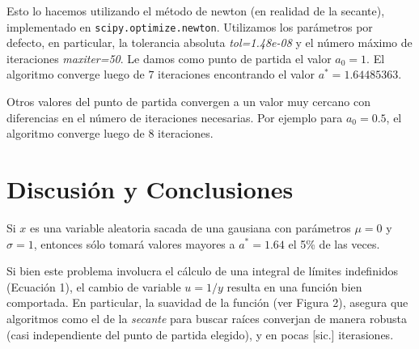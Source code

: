 \documentclass[letter, 11pt]{article}
\begin{document}
Esto lo hacemos utilizando el método de newton (en realidad de la secante),
implementado en \texttt{scipy.optimize.newton}. Utilizamos los parámetros por
defecto, en particular, la tolerancia absoluta {\it tol=1.48e-08} y el número
máximo de iteraciones {\it maxiter=50}. Le damos como punto de partida el valor
$a_0=1$. El algoritmo converge luego de $7$ iteraciones encontrando el valor
$a^*= 1.64485363$.

Otros valores del punto de partida convergen a un valor muy cercano con
diferencias en el número de iteraciones necesarias. Por ejemplo para $a_0=0.5$,
el algoritmo converge luego de 8 iteraciones.

\section{Discusión y Conclusiones}

Si $x$ es una variable aleatoria sacada de una gausiana con parámetros $\mu=0$
y $\sigma=1$, entonces sólo tomará valores mayores a $a^*=1.64$ el 5\% de las
veces.

Si bien este problema involucra el cálculo de una integral de límites
indefinidos (Ecuación 1), el cambio de variable $u = 1/y$ resulta en una
función bien comportada. En particular, la suavidad de la función (ver Figura
2), asegura que algoritmos como el de la {\it secante} para buscar raíces
converjan de manera robusta (casi independiente del punto de partida elegido),
y en pocas [sic.] iterasiones.
\end{document}
